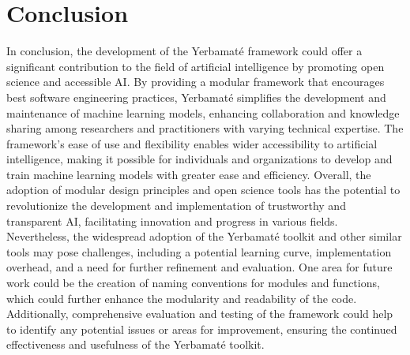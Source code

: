 \documentclass{IEEEtran}
\begin{document}
\section{Conclusion}
In conclusion, the development of the Yerbamaté framework could offer a significant contribution to the field of artificial intelligence by promoting open science and accessible AI. By providing a modular framework that encourages best software engineering practices, Yerbamaté simplifies the development and maintenance of machine learning models, enhancing collaboration and knowledge sharing among researchers and practitioners with varying technical expertise. The framework's ease of use and flexibility enables wider accessibility to artificial intelligence, making it possible for individuals and organizations to develop and train machine learning models with greater ease and efficiency. Overall, the adoption of modular design principles and open science tools has the potential to revolutionize the development and implementation of trustworthy and transparent AI, facilitating innovation and progress in various fields. Nevertheless, the widespread adoption of the Yerbamaté toolkit and other similar tools may pose challenges, including a potential learning curve, implementation overhead, and a need for further refinement and evaluation. One area for future work could be the creation of naming conventions for modules and functions, which could further enhance the modularity and readability of the code. Additionally, comprehensive evaluation and testing of the framework could help to identify any potential issues or areas for improvement, ensuring the continued effectiveness and usefulness of the Yerbamaté toolkit.
 
\clearpage
\newpage


\printbibliography



\end{document}

